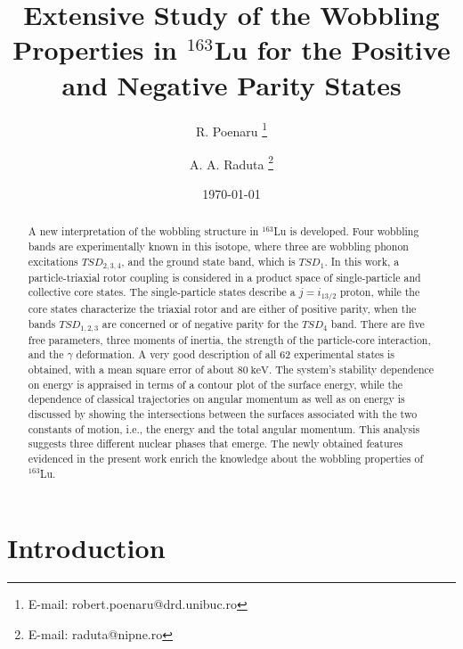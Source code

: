 \documentclass[11pt]{article}
\title{Extensive Study of the Wobbling Properties in $^{163}$Lu for the Positive and Negative Parity States}
\author[1,2]{R. Poenaru \thanks{E-mail: robert.poenaru@drd.unibuc.ro}}
\author[2,3]{A. A. Raduta \thanks{E-mail: raduta@nipne.ro}}
\affil[1]{Doctoral School of Physics, University of Bucharest, Romania}
\affil[2]{\textit{Horia Hulubei} National Institute for Physics and Nuclear Engineering, M\u{a}gurele-Bucharest, Romania}
\affil[3]{Academy of Romanian Scientists, Bucharest, Romania}
\date{\today}
\begin{document}
\maketitle

\begin{abstract}
A new interpretation of the wobbling structure in $^{163}$Lu is developed. Four wobbling bands are experimentally known in this isotope, where three are wobbling phonon excitations $TSD_{2,3,4}$, and the ground state band, which is $TSD_1$. In this work, a particle-triaxial rotor coupling is considered in a product space of single-particle and collective core states. The single-particle states describe a $j=i_{13/2}$ proton, while the core states characterize the triaxial rotor and are either of positive parity, when the bands $TSD_{1,2,3}$ are concerned or of negative parity for the $TSD_4$ band. There are five free parameters, three moments of inertia, the strength of the particle-core interaction, and the $\gamma$ deformation. A very good description of all 62 experimental states is obtained, with a mean square error of about $80\ \text{keV}$. The system's stability dependence on energy is appraised in terms of a contour plot of the surface energy, while the dependence of classical trajectories on angular momentum as well as on energy is discussed by showing the intersections between the surfaces associated with the two constants of motion, i.e., the energy and the total angular momentum. This analysis suggests three different nuclear phases that emerge. The newly obtained features evidenced in the present work enrich the knowledge about the wobbling properties of $^{163}$Lu.
\end{abstract}


\section{Introduction}
\end{document}
